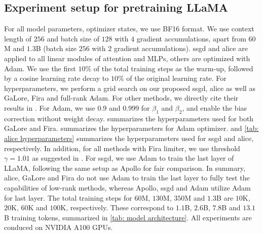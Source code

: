 \subsection{Experiment setup for pretraining LLaMA}
\label{subapp: pretrain experiment setup}
For all model parameters, optimizer states, we use BF16 format.
We use context length of $256$ and batch size of $128$ with $4$ gradient accumulations, apart from $60$M and $1.3$B (batch size $256$ with $2$ gradient accumulations). \gls{ssgd} and \gls{alice} are applied to all linear modules of attention and MLPs, others are optimized with Adam.
We use the first $10\%$ of the total training steps as the warm-up, followed by a cosine learning rate decay to $10\%$ of the original learning rate. For hyperparameters, we perform a grid search on our proposed \gls{ssgd}, \gls{alice} as well as GaLore, Fira and full-rank Adam. For other methods, we directly cite their results in \citep{zhu2024apollo}. For Adam, we use $0.9$ and $0.999$ for $\beta_1$ and $\beta_2$, and enable the bias correction without weight decay.  summarizes the hyperparameters used for both GaLore and Fira.  summarizes the hyperparameters for Adam optimizer.  and \cref{tab: alice hyperparameters} summarizes the hyperparameters used for \gls{ssgd} and \gls{alice}, respectively. In addition, for all methods with Fira limiter, we use threshold $\gamma=1.01$ as suggested in \cite{chen2024fira}. For \gls{ssgd}, we use Adam to train the last layer of LLaMA, following the same setup as Apollo for fair comparison. In summary, \gls{alice}, GaLore and Fira do not use Adam to train the last layer to fully test the capabilities of low-rank methods, whereas Apollo, \gls{ssgd} and Adam utilize Adam for last layer. 
The total training steps for $60$M, $130$M, $350$M and $1.3$B are $10$K, $20$K, $60$K and $100$K, respectively. These correspond to $1.1$B, $2.6$B, $7.8$B and $13.1$B training tokens, summarized in \cref{tab: model architecture}. All experiments are conduced on NVIDIA A100 GPUs.

